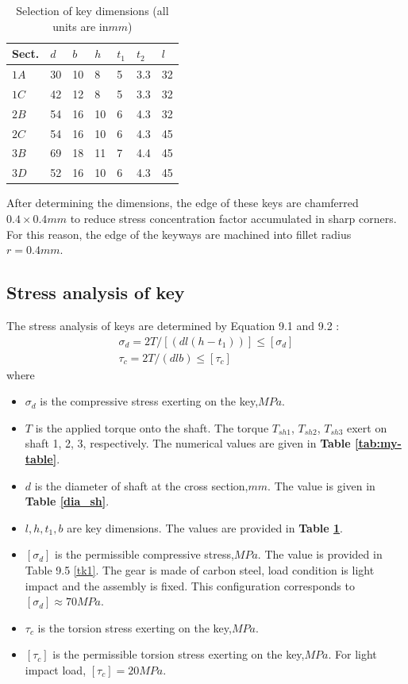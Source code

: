 \begin{table}[ht]
	\centering
	\caption{Selection of key dimensions (all units are in$ \unit{mm} $)}
	\begin{tabular}{lllllll}\toprule
		Sect. & $ d $ & $ b $ & $ h $ & $ t_1 $ & $ t_2 $ & $ l $\\\midrule
		$ 1A $ & 30 & 10 & 8 & 5 & 3.3 & 32\\
		$ 1C $ & 42 & 12 & 8 & 5 & 3.3 & 32\\
		$ 2B $ & 54 & 16 & 10 & 6 & 4.3 & 32\\
		$ 2C $ & 54 & 16 & 10 & 6 & 4.3 & 45\\
		$ 3B $ & 69 & 18 & 11 & 7 & 4.4 & 45\\
		$ 3D $ & 52 & 16 & 10 & 6 & 4.3 & 45\\\bottomrule
	\end{tabular}
	\label{keydimtab}
\end{table}

After determining the dimensions, the edge of these keys are chamferred $ 0.4\times 0.4 \unit{mm} $ to reduce stress concentration factor accumulated in sharp corners. For this reason, the edge of the keyways are machined into fillet radius $ r = 0.4 \unit{mm} $.

\subsection{Stress analysis of key}
The stress analysis of keys are determined by Equation 9.1 and 9.2 \cite{tk1}:
\[
\begin{array}{l}
\sigma_d = 2T/[(dl(h-t_1))] \leq [\sigma_d]\\
\tau_c = 2T/(dlb) \leq [\tau_c]
\end{array}
\]
where
\begin{itemize}
	\item $ \sigma_d $ is the compressive stress exerting on the key,$ \unit{MPa} $.
	\item $ T $ is the applied torque onto the shaft. The torque $ T_{sh1} $, $ T_{sh2} $, $ T_{sh3} $ exert on shaft 1, 2, 3, respectively. The numerical values are given in \textbf{Table \ref{tab:my-table}}.
	\item $ d $ is the diameter of shaft at the cross section,$ \unit{mm} $. The value is given in \textbf{Table \ref{dia_sh}}.
	\item $ l, h, t_1, b $ are key dimensions. The values are provided in \textbf{Table \ref{keydimtab}}.
	\item $ [\sigma_d] $ is the permissible compressive stress,$ \unit{MPa} $. The value is provided in Table 9.5 \ref{tk1}. The gear is made of carbon steel, load condition is light impact and the assembly is fixed. This configuration corresponds to $ [\sigma_d] \approx 70 \unit{MPa} $.
	\item $ \tau_c $ is the torsion stress exerting on the key,$ \unit{MPa} $.
	\item $ [\tau_c] $ is the permissible torsion stress exerting on the key,$ \unit{MPa} $. For light impact load, $ [\tau_c] = 20 \unit{MPa} $.
\end{itemize}

